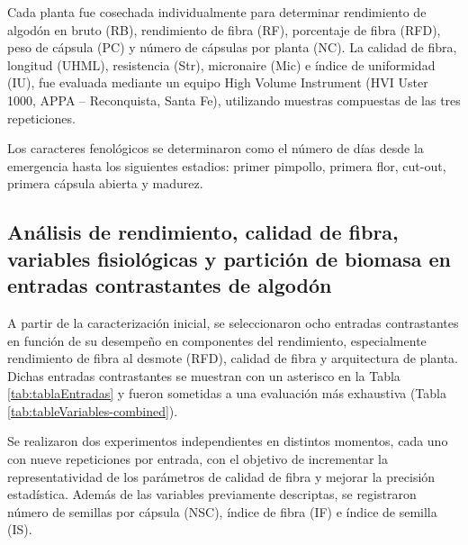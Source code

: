 \documentclass[12pt,oneside]{reedthesis}
\begin{document}
Cada planta fue cosechada individualmente para determinar rendimiento de algodón en bruto (RB), rendimiento de fibra (RF), porcentaje de fibra (RFD), peso de cápsula (PC) y número de cápsulas por planta (NC). La calidad de fibra, longitud (UHML), resistencia (Str), micronaire (Mic) e índice de uniformidad (IU), fue evaluada mediante un equipo High Volume Instrument (HVI Uster 1000, APPA -- Reconquista, Santa Fe), utilizando muestras compuestas de las tres repeticiones.

Los caracteres fenológicos se determinaron como el número de días desde la emergencia hasta los siguientes estadios: primer pimpollo, primera flor, cut-out, primera cápsula abierta y madurez.

\subsection{Análisis de rendimiento, calidad de fibra, variables fisiológicas y partición de biomasa en entradas contrastantes de algodón}\label{anuxe1lisis-de-rendimiento-calidad-de-fibra-variables-fisioluxf3gicas-y-particiuxf3n-de-biomasa-en-entradas-contrastantes-de-algoduxf3n}

A partir de la caracterización inicial, se seleccionaron ocho entradas contrastantes en función de su desempeño en componentes del rendimiento, especialmente rendimiento de fibra al desmote (RFD), calidad de fibra y arquitectura de planta. Dichas entradas contrastantes se muestran con un asterisco en la Tabla \ref{tab:tablaEntradas} y fueron sometidas a una evaluación más exhaustiva (Tabla \ref{tab:tableVariables-combined}).

Se realizaron dos experimentos independientes en distintos momentos, cada uno con nueve repeticiones por entrada, con el objetivo de incrementar la representatividad de los parámetros de calidad de fibra y mejorar la precisión estadística. Además de las variables previamente descriptas, se registraron número de semillas por cápsula (NSC), índice de fibra (IF) e índice de semilla (IS).
\end{document}
